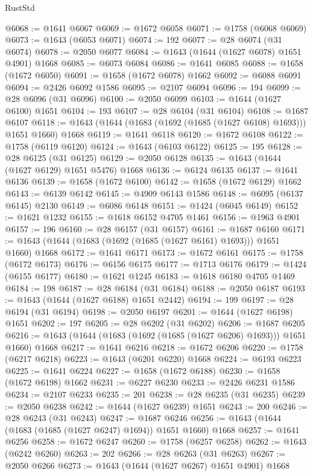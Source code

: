 \begin{lexlean}{RustStd}
\begin{coremodule}
@6068 := @1641 @6067
@6069 := @1672 @6058
@6071 := @1758 (@6068 @6069)
@6073 := @1643 (@6053 @6071)
@6074 := 192
@6077 := @28 @6074 (@31 @6074)
@6078 := @2050 @6077
@6084 := @1643 (@1644 (@1627 @6078) @1651 @4901) @1668
@6085 := @6073 @6084
@6086 := @1641 @6085
@6088 := @1658 (@1672 @6050)
@6091 := @1658 (@1672 @6078) @1662
@6092 := @6088 @6091
@6094 := @2426 @6092 @1586
@6095 := @2107 @6094
@6096 := 194
@6099 := @28 @6096 (@31 @6096)
@6100 := @2050 @6099
@6103 := @1644 (@1627 @6100) @1651
@6104 := 193
@6107 := @28 @6104 (@31 @6104)
@6108 := @1687 @6107
@6118 := @1643 (@1644 (@1683 (@1692 (@1685 (@1627 @6108) @1693))) @1651 @1660) @1668
@6119 := @1641 @6118
@6120 := @1672 @6108
@6122 := @1758 (@6119 @6120)
@6124 := @1643 (@6103 @6122)
@6125 := 195
@6128 := @28 @6125 (@31 @6125)
@6129 := @2050 @6128
@6135 := @1643 (@1644 (@1627 @6129) @1651 @5476) @1668
@6136 := @6124 @6135
@6137 := @1641 @6136
@6139 := @1658 (@1672 @6100)
@6142 := @1658 (@1672 @6129) @1662
@6143 := @6139 @6142
@6145 := @4909 @6143 @1586
@6148 := @6095 (@6137 @6145) @2130
@6149 := @6086 @6148
@6151 := @1424 (@6045 @6149)
@6152 := @1621 @1232
@6155 := @1618 @6152 @4705 @1461
@6156 := @1963 @4901
@6157 := 196
@6160 := @28 @6157 (@31 @6157)
@6161 := @1687 @6160
@6171 := @1643 (@1644 (@1683 (@1692 (@1685 (@1627 @6161) @1693))) @1651 @1660) @1668
@6172 := @1641 @6171
@6173 := @1672 @6161
@6175 := @1758 (@6172 @6173)
@6176 := @6156 @6175
@6177 := @1713 @6176
@6179 := @1424 (@6155 @6177)
@6180 := @1621 @1245
@6183 := @1618 @6180 @4705 @1469
@6184 := 198
@6187 := @28 @6184 (@31 @6184)
@6188 := @2050 @6187
@6193 := @1643 (@1644 (@1627 @6188) @1651 @2442)
@6194 := 199
@6197 := @28 @6194 (@31 @6194)
@6198 := @2050 @6197
@6201 := @1644 (@1627 @6198) @1651
@6202 := 197
@6205 := @28 @6202 (@31 @6202)
@6206 := @1687 @6205
@6216 := @1643 (@1644 (@1683 (@1692 (@1685 (@1627 @6206) @1693))) @1651 @1660) @1668
@6217 := @1641 @6216
@6218 := @1672 @6206
@6220 := @1758 (@6217 @6218)
@6223 := @1643 (@6201 @6220) @1668
@6224 := @6193 @6223
@6225 := @1641 @6224
@6227 := @1658 (@1672 @6188)
@6230 := @1658 (@1672 @6198) @1662
@6231 := @6227 @6230
@6233 := @2426 @6231 @1586
@6234 := @2107 @6233
@6235 := 201
@6238 := @28 @6235 (@31 @6235)
@6239 := @2050 @6238
@6242 := @1644 (@1627 @6239) @1651
@6243 := 200
@6246 := @28 @6243 (@31 @6243)
@6247 := @1687 @6246
@6256 := @1643 (@1644 (@1683 (@1685 (@1627 @6247) @1694)) @1651 @1660) @1668
@6257 := @1641 @6256
@6258 := @1672 @6247
@6260 := @1758 (@6257 @6258)
@6262 := @1643 (@6242 @6260)
@6263 := 202
@6266 := @28 @6263 (@31 @6263)
@6267 := @2050 @6266
@6273 := @1643 (@1644 (@1627 @6267) @1651 @4901) @1668

\end{coremodule}
\end{lexlean}
